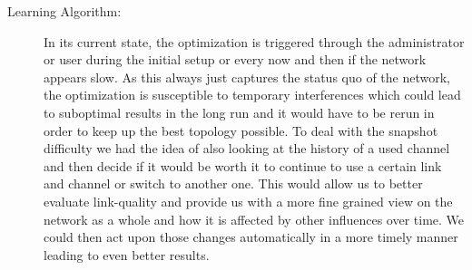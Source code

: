 \begin{description}
      \item[Learning Algorithm:]
	In its current state, the optimization is triggered through the administrator or user during the initial setup or every now and then if
	the network appears slow. As this always just captures the status quo of the network, the optimization is susceptible to
	temporary interferences which could lead to suboptimal results in the long run and it would have to be rerun in order to keep up the best topology possible.
	To deal with the snapshot difficulty we had the idea of also looking at the history of a used channel and then decide if it would be worth it to continue
	to use a certain link and channel or switch to another one. 
	This would allow us to better evaluate link-quality and provide us with a more fine 
	grained view on the network as a whole and how it is affected by other influences over time. 
	We could then act upon those changes automatically in a more timely manner leading to even better results.
	
    \end{description}